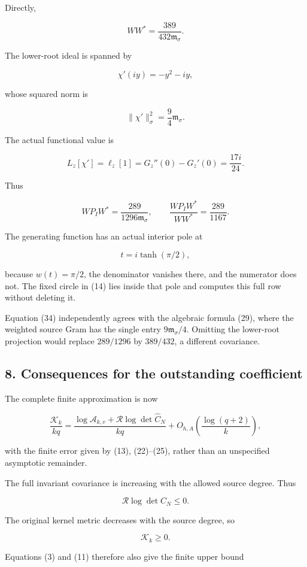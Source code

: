 \documentclass[11pt]{article}
\begin{document}
Directly,

\[
WW^*=\frac{389}{432\mathfrak m_\sigma}.
\]

The lower-root ideal is spanned by

\[
\chi'(iy)=-y^2-iy,
\]

whose squared norm is

\[
\|\chi'\|_\sigma^2=\frac94\mathfrak m_\sigma.
\]

The actual functional value is

\[
L_z[\chi']=\ell_z[1]=G_z''(0)-G_z'(0)=\frac{17i}{24}.
\]

Thus

\[
\boxed{
WP_IW^*
=
\frac{289}{1296\mathfrak m_\sigma},
\qquad
\frac{WP_IW^*}{WW^*}
=
\frac{289}{1167}.
}
\tag{34}
\]

The generating function has an actual interior pole at

\[
t=i\tanh(\pi/2),
\]

because \(w(t)=\pi/2\), the denominator vanishes there, and the numerator does not. The fixed circle in (14) lies inside that pole and computes this full row without deleting it.

Equation (34) independently agrees with the algebraic formula (29), where the weighted source Gram has the single entry \(9\mathfrak m_\sigma/4\). Omitting the lower-root projection would replace \(289/1296\) by \(389/432\), a different covariance.

\subsection{8. Consequences for the outstanding coefficient}\label{consequences-for-the-outstanding-coefficient}

The complete finite approximation is now

\[
\boxed{
\frac{\mathcal K_k}{kq}
=
\frac{
\log\mathcal A_{k,v}
+\mathcal R\log\det\widehat C_N
}{kq}
+
O_{h,A}\!\left(\frac{\log(q+2)}k\right),
}
\tag{35}
\]

with the finite error given by (13), (22)--(25), rather than an unspecified asymptotic remainder.

The full invariant covariance is increasing with the allowed source degree. Thus

\[
\mathcal R\log\det C_N\le0.
\]

The original kernel metric decreases with the source degree, so

\[
\mathcal K_k\ge0.
\]

Equations (3) and (11) therefore also give the finite upper bound
\end{document}
